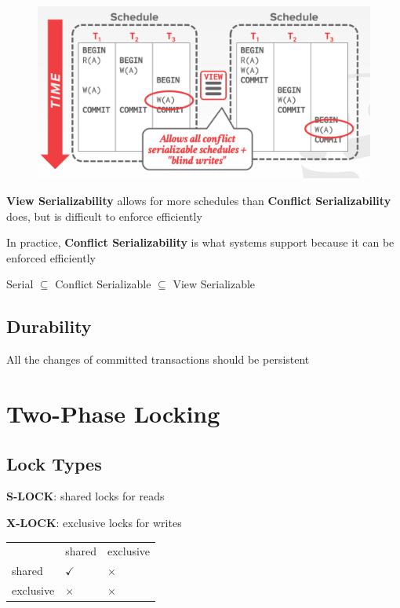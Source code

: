 \documentclass[11pt]{article}
\begin{document}
\begin{figure}[htbp]
\centering
\includegraphics[width=.8\textwidth]{../images/15445/56.png}
\label{}
\end{figure}

\textbf{View Serializability} allows for more schedules than \textbf{Conflict Serializability} does, but is
difficult to enforce efficiently

In practice, \textbf{Conflict Serializability} is what systems support because it can be enforced efficiently


Serial \(\subseteq\) Conflict Serializable \(\subseteq\) View Serializable
\subsection{Durability}
\label{sec:org8709b42}
All the changes of committed transactions should be persistent
\section{Two-Phase Locking}
\label{sec:org9d4a6af}
\subsection{Lock Types}
\label{sec:orgd53e704}
\textbf{S-LOCK}: shared locks for reads

\textbf{X-LOCK}: exclusive locks for writes

\begin{center}
\begin{tabular}{lll}
 & shared & exclusive\\
shared & \(\checkmark\) & \(\times\)\\
exclusive & \(\times\) & \(\times\)\\
\end{tabular}
\end{center}
\end{document}
